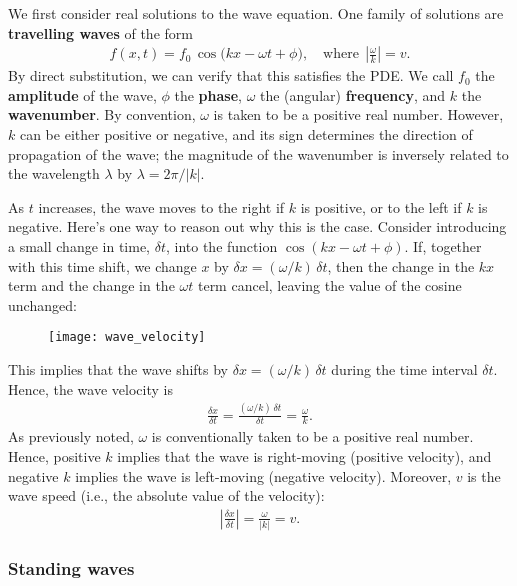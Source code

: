 \documentclass[10pt,a4paper]{article}
\begin{document}
We first consider real solutions to the wave equation. One family of
solutions are \textbf{travelling waves} of the form
\begin{align}
  f(x,t) = f_0 \, \cos\!\big(kx - \omega t + \phi\big),\quad\mathrm{where}\;\, \left|\frac{\omega}{k}\right| = v.
\end{align}
By direct substitution, we can verify that this satisfies the PDE.  We
call $f_0$ the \textbf{amplitude} of the wave, $\phi$ the
\textbf{phase}, $\omega$ the (angular) \textbf{frequency}, and $k$ the
\textbf{wavenumber}. By convention, $\omega$ is taken to be a positive
real number. However, $k$ can be either positive or negative, and its
sign determines the direction of propagation of the wave; the
magnitude of the wavenumber is inversely related to the wavelength
$\lambda$ by $\lambda = 2\pi/|k|$.

As $t$ increases, the wave moves to the right if $k$ is positive, or
to the left if $k$ is negative.  Here's one way to reason out why this
is the case. Consider introducing a small change in time, $\delta t$,
into the function $\cos(kx - \omega t + \phi)$. If, together with this
time shift, we change $x$ by $\delta x = (\omega/k)\, \delta t$, then
the change in the $kx$ term and the change in the $\omega t$ term
cancel, leaving the value of the cosine unchanged:

\begin{figure}[ht]
  \centering\texttt{[image: wave\_velocity]}
\end{figure}

This implies that the wave shifts by $\delta x = (\omega/k)\, \delta
t$ during the time interval $\delta t$. Hence, the wave velocity is
\begin{align}
  \frac{\delta x}{\delta t} = \frac{(\omega/k)\,\delta t}{\delta t} = \frac{\omega}{k}.
\end{align}
As previously noted, $\omega$ is conventionally taken to be a positive
real number. Hence, positive $k$ implies that the wave is right-moving
(positive velocity), and negative $k$ implies the wave is left-moving
(negative velocity). Moreover, $v$ is the wave speed (i.e., the
absolute value of the velocity):
\begin{align}
  \left|\frac{\delta x}{\delta t}\right| = \frac{\omega}{\left|k\right|} = v.
\end{align}

\subsubsection{Standing waves}
\label{standing-waves}
\end{document}
